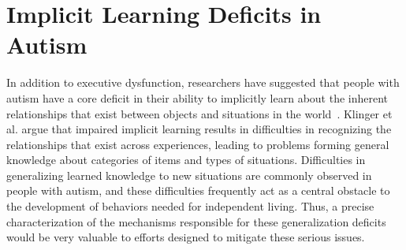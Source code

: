 %
%

\section{Implicit Learning Deficits in Autism}



In addition to executive dysfunction, researchers have suggested that people with autism have a core deficit in their ability to implicitly learn about the inherent relationships that exist between objects and situations in the world~\cite{RefWorks:148,RefWorks:149}.  Klinger et al. argue that impaired implicit learning results in difficulties in recognizing the relationships that exist across experiences, leading to problems forming general knowledge about categories of items and types of situations.  Difficulties in generalizing learned knowledge to new situations are commonly observed in people with autism, and these difficulties frequently act as a central obstacle to the development of behaviors needed for independent living.  Thus, a precise characterization of the mechanisms responsible for these generalization deficits would be very valuable to efforts designed to mitigate these serious issues.

